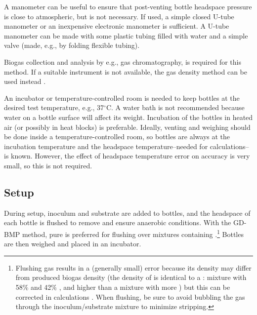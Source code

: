 \documentclass[]{article}
\begin{document}
A manometer can be useful to ensure that post-venting bottle headspace pressure is close to atmospheric, but is not necessary.
If used, a simple closed U-tube manometer or an inexpensive electronic manometer is sufficient.
A U-tube manometer can be made with some plastic tubing filled with water and a simple valve (made, e.g., by folding flexible tubing).

Biogas collection and analysis by e.g., gas chromatography, is required for this method.
If a suitable instrument is not available, the gas density method can be used instead \citep{BMPdoc204gasdens, BMPdoc304gasdens}.

An incubator or temperature-controlled room is needed to keep bottles at the desired test temperature, e.g., 37$^\circ$C.
A water bath is not recommended because water on a bottle surface will affect its weight.
Incubation of the bottles in heated air (or possibly in heat blocks) is preferable.
Ideally, venting and weighing should be done inside a temperature-controlled room, so bottles are always at the incubation temperature and the headspace temperature--needed for calculations--is known.  
However, the effect of headspace temperature error on accuracy is very small, so this is not required.

\subsection{Setup}
During setup, inoculum and substrate are added to bottles, and the headspace of each bottle is flushed to remove  and ensure anaerobic conditions. 
With the GD-BMP method, pure  is preferred for flushing over mixtures containing .\footnote{
  Flushing gas results in a (generally small) error because its density may differ from produced biogas density (the density of  is identical to a : mixture with 58\%  and 42\% , and higher than a mixture with more ) but this can be corrected in calculations \citep{justesenDevelopmentValidationLowcost2019}. 
When flushing, be sure to avoid bubbling the gas through the inoculum/substrate mixture to minimize  stripping.
}
Bottles are then weighed and placed in an incubator.
\end{document}
